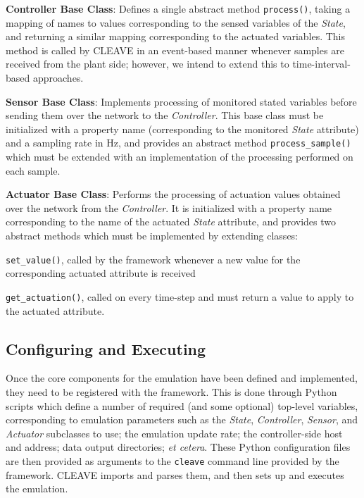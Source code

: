 
\textbf{Controller Base Class}:
Defines a single abstract method \texttt{process()}, taking a mapping of names to values corresponding to the sensed variables of the \emph{State}, and returning a similar mapping corresponding to the actuated variables.
This method is called by \gls{CLEAVE} in an event-based manner whenever samples are received from the plant side; however, we intend to extend this to time-interval-based approaches.

\textbf{Sensor Base Class}:
Implements processing of monitored stated variables before sending them over the network to the \emph{Controller}.
This base class must be initialized with a property name (corresponding to the monitored \emph{State} attribute) and a sampling rate in \si{\hertz}, and provides an abstract method \texttt{process_sample()} which must be extended with an implementation of the processing performed on each sample.

\textbf{Actuator Base Class}:
Performs the processing of actuation values obtained over the network from the \emph{Controller}.
It is initialized with a property name corresponding to the name of the actuated \emph{State} attribute, and provides two abstract methods which must be implemented by extending classes:
\begin{enumerate*}[itemjoin={{; }}, itemjoin*={{; and }}]
\item \texttt{set_value()}, called by the framework whenever a new value for the corresponding actuated attribute is received
\item \texttt{get_actuation()}, called on every time-step and must return a value to apply to the actuated attribute.
\end{enumerate*}


\subsection{Configuring and Executing }

Once the core components for the emulation have been defined and implemented, they need to be registered with the framework.
This is done through Python scripts which define a number of required (and some optional) top-level variables, corresponding to emulation parameters such as the \emph{State}, \emph{Controller}, \emph{Sensor}, and \emph{Actuator} subclasses to use; the emulation update rate; the controller-side host and address; data output directories; \emph{et cetera}.
These Python configuration files are then provided as arguments to the \texttt{cleave} command line provided by the framework.
\gls{CLEAVE} imports and parses them, and then sets up and executes the emulation.

